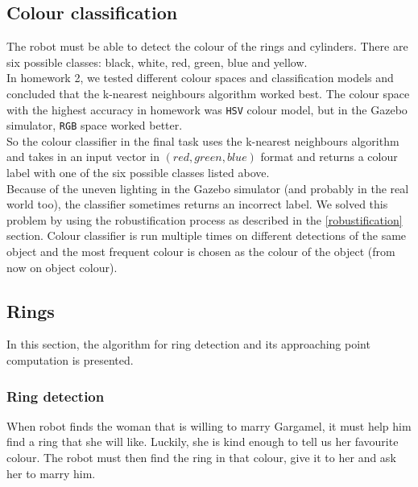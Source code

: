 \documentclass[12pt,a4paper]{article}
\begin{document}
	
	\subsection{Colour classification} \label{colour_classification}
	The robot must be able to detect the colour of the rings and cylinders. There are six possible classes: black, white, red, green, blue and yellow. \\
	
	In homework 2, we tested different colour spaces and classification models and concluded that the k-nearest neighbours algorithm worked best. The colour space with the highest accuracy in homework was \texttt{HSV} colour model, but in the Gazebo simulator, \texttt{RGB} space worked better. \\
	
	So the colour classifier in the final task uses the k-nearest neighbours algorithm and takes in an input vector in $(red, green, blue)$ format and returns a colour label with one of the six possible classes listed above. \\
	
	Because of the uneven lighting in the Gazebo simulator (and probably in the real world too), the classifier sometimes returns an incorrect label. We solved this problem by using the robustification process as described in the \ref{robustification} section. Colour classifier is run multiple times on different detections of the same object and the most frequent colour is chosen as the colour of the object (from now on object colour). \\
	
	\subsection{Rings}
	In this section, the algorithm for ring detection and its approaching point computation is presented.
	
	\subsubsection{Ring detection} \label{ring_detection}
	When robot finds the woman that is willing to marry Gargamel, it must help him find a ring that she will like. Luckily, she is kind enough to tell us her favourite colour. The robot must then find the ring in that colour, give it to her and ask her to marry him. \\
	
\end{document}
